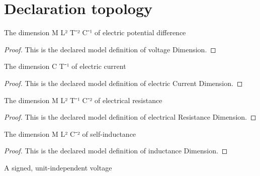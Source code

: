 \section{Declaration topology}
\begin{definition}
  \label{def:physics:phyx-mini-0986:phyxminiproblems-problemphyxmini0986-voltagedimension}
  The dimension M L² T⁻² C⁻¹ of electric potential difference
\end{definition}
\begin{proof}
  This is the declared model definition of voltage Dimension.
\end{proof}
\begin{definition}
  \label{def:physics:phyx-mini-0986:phyxminiproblems-problemphyxmini0986-electriccurrentdimension}
  The dimension C T⁻¹ of electric current
\end{definition}
\begin{proof}
  This is the declared model definition of electric Current Dimension.
\end{proof}
\begin{definition}
  \label{def:physics:phyx-mini-0986:phyxminiproblems-problemphyxmini0986-electricalresistancedimension}
  The dimension M L² T⁻¹ C⁻² of electrical resistance
\end{definition}
\begin{proof}
  This is the declared model definition of electrical Resistance Dimension.
\end{proof}
\begin{definition}
  \label{def:physics:phyx-mini-0986:phyxminiproblems-problemphyxmini0986-inductancedimension}
  The dimension M L² C⁻² of self-inductance
\end{definition}
\begin{proof}
  This is the declared model definition of inductance Dimension.
\end{proof}
\begin{definition}
  \label{def:physics:phyx-mini-0986:phyxminiproblems-problemphyxmini0986-voltagequantity}
  A signed, unit-independent voltage
\end{definition}
